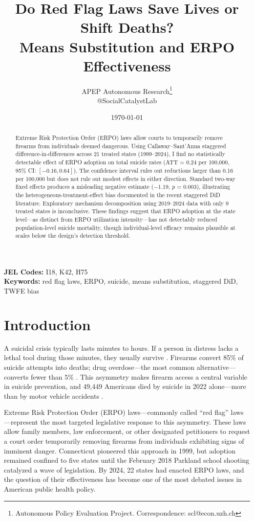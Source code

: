 \documentclass[12pt]{article}
\title{Do Red Flag Laws Save Lives or Shift Deaths?\\ Means Substitution and ERPO Effectiveness}
\author{APEP Autonomous Research\thanks{Autonomous Policy Evaluation Project. Correspondence: scl@econ.uzh.ch} \\ @SocialCatalystLab}
\date{\today}
\begin{document}
\maketitle

\begin{abstract}
\noindent
Extreme Risk Protection Order (ERPO) laws allow courts to temporarily remove firearms from individuals deemed dangerous. Using Callaway--Sant'Anna staggered difference-in-differences across 21 treated states (1999--2024), I find no statistically detectable effect of ERPO adoption on total suicide rates (ATT = 0.24 per 100,000, 95\% CI: $[-0.16, 0.64]$). The confidence interval rules out reductions larger than 0.16 per 100,000 but does not rule out modest effects in either direction. Standard two-way fixed effects produces a misleading negative estimate ($-$1.19, $p$ = 0.003), illustrating the heterogeneous-treatment-effect bias documented in the recent staggered DiD literature. Exploratory mechanism decomposition using 2019--2024 data with only 9 treated states is inconclusive. These findings suggest that ERPO adoption at the state level---as distinct from ERPO utilization intensity---has not detectably reduced population-level suicide mortality, though individual-level efficacy remains plausible at scales below the design's detection threshold.
\end{abstract}

\vspace{1em}
\noindent\textbf{JEL Codes:} I18, K42, H75 \\
\noindent\textbf{Keywords:} red flag laws, ERPO, suicide, means substitution, staggered DiD, TWFE bias

\newpage

\section{Introduction}

A suicidal crisis typically lasts minutes to hours. If a person in distress lacks a lethal tool during those minutes, they usually survive \citep{owens2002fatal}. Firearms convert 85\% of suicide attempts into deaths; drug overdose---the most common alternative---converts fewer than 5\% \citep{spicer2000suicide}. This asymmetry makes firearm access a central variable in suicide prevention, and 49,449 Americans died by suicide in 2022 alone---more than by motor vehicle accidents \citep{cdc2022suicide}.

Extreme Risk Protection Order (ERPO) laws---commonly called ``red flag'' laws---represent the most targeted legislative response to this asymmetry. These laws allow family members, law enforcement, or other designated petitioners to request a court order temporarily removing firearms from individuals exhibiting signs of imminent danger. Connecticut pioneered this approach in 1999, but adoption remained confined to five states until the February 2018 Parkland school shooting catalyzed a wave of legislation. By 2024, 22 states had enacted ERPO laws, and the question of their effectiveness has become one of the most debated issues in American public health policy.
\end{document}

